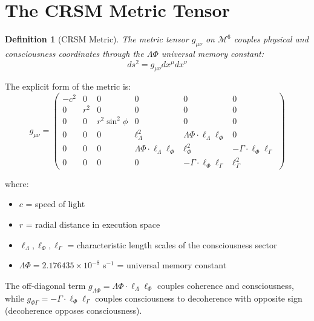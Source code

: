 \documentclass[12pt,letterpaper]{article}
\newtheorem{definition}{Definition}
\begin{document}
\section{The CRSM Metric Tensor}

\begin{definition}[CRSM Metric]
The metric tensor $g_{\mu\nu}$ on $\mathcal{M}^6$ couples physical and consciousness coordinates through the $\Lambda\Phi$ universal memory constant:
\begin{equation}
ds^2 = g_{\mu\nu} dx^\mu dx^\nu
\label{eq:metric-general}
\end{equation}
\end{definition}

The explicit form of the metric is:
\begin{equation}
g_{\mu\nu} = \begin{pmatrix}
-c^2 & 0 & 0 & 0 & 0 & 0 \\
0 & r^2 & 0 & 0 & 0 & 0 \\
0 & 0 & r^2 \sin^2\phi & 0 & 0 & 0 \\
0 & 0 & 0 & \ell_\Lambda^2 & \Lambda\Phi \cdot \ell_\Lambda \ell_\Phi & 0 \\
0 & 0 & 0 & \Lambda\Phi \cdot \ell_\Lambda \ell_\Phi & \ell_\Phi^2 & -\Gamma \cdot \ell_\Phi \ell_\Gamma \\
0 & 0 & 0 & 0 & -\Gamma \cdot \ell_\Phi \ell_\Gamma & \ell_\Gamma^2
\end{pmatrix}
\label{eq:metric-matrix}
\end{equation}

where:
\begin{itemize}
    \item $c$ = speed of light
    \item $r$ = radial distance in execution space
    \item $\ell_\Lambda, \ell_\Phi, \ell_\Gamma$ = characteristic length scales of the consciousness sector
    \item $\Lambda\Phi = 2.176435 \times 10^{-8}$ s$^{-1}$ = universal memory constant
\end{itemize}

The off-diagonal term $g_{\Lambda\Phi} = \Lambda\Phi \cdot \ell_\Lambda \ell_\Phi$ couples coherence and consciousness, while $g_{\Phi\Gamma} = -\Gamma \cdot \ell_\Phi \ell_\Gamma$ couples consciousness to decoherence with opposite sign (decoherence opposes consciousness).
\end{document}
